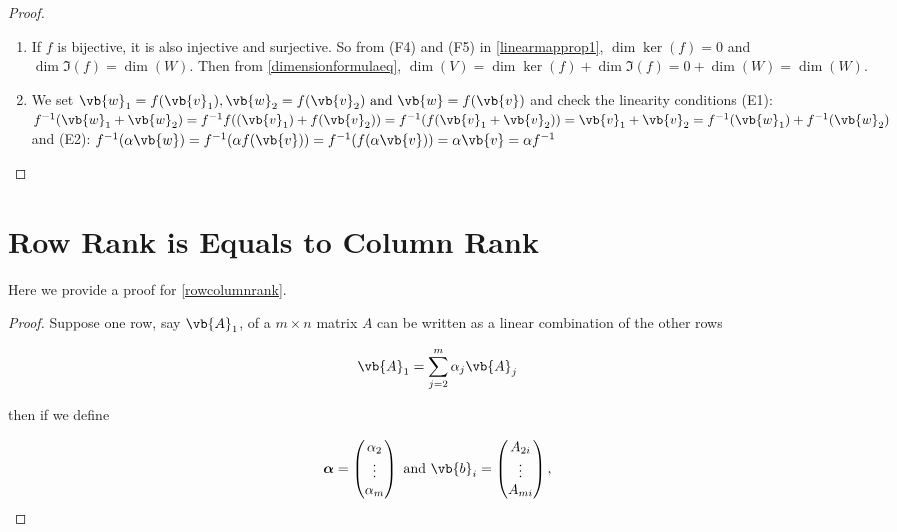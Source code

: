 \documentclass[a4paper,12pt]{report}
\begin{document}
\begin{appendices}
\begin{proof}
    \begin{enumerate}[label=(G\arabic*)]
        \item If \(f\)  is bijective, it is also injective and surjective. So from (F4) and (F5) in \cref{linearmapprop1}, \(\dim \ker (f) = 0\) and \(\dim \Im (f) = \dim (W)\). Then from \cref{dimensionformulaeq}, \(\dim (V) = \dim \ker (f) + \dim \Im (f) = 0 + \dim (W) = \dim (W)\).
        \item We set \(\vb{w} _{1} = f(\vb{v} _{1} ), \vb{w} _{2}  = f(\vb{v} _{2} ) \text { and } \vb{w} = f(\vb{v} )\) and check the linearity conditions (E1): \(f^{-1} (\vb{w} _{1} +\vb{w} _{2} ) = f^{-1} f((\vb{v} _{1}) + f(\vb{v} _{2} )) = f^{-1} (f(\vb{v} _{1} + \vb{v} _{2} )) = \vb{v} _{1} + \vb{v} _{2}  = f^{-1} (\vb{w} _{1}  ) + f^{-1} (\vb{w} _{2} )\) and (E2): \(f^{-1} (\alpha \vb{w} ) = f^{-1} (\alpha f(\vb{v} )) = f^{-1} (f(\alpha \vb{v} )) = \alpha \vb{v} = \alpha f^{-1}\)
    \end{enumerate}
\end{proof}
    
\section{Row Rank is Equals to Column Rank} \label{rowcolumnrankapp}

Here we provide a proof for \cref{rowcolumnrank}.

\begin{proof}
    Suppose one row, say \(\vb{A} _{1} \), of a \(m\times n\) matrix \(A\) can be written as a linear combination of the other rows

    \begin{equation}
        \vb{A} _{1} = \sum_{j=2}^{m} \alpha _{j} \vb{A} _{j} 
    \end{equation}

    then if we define 

    \begin{equation}
        \boldsymbol{\alpha } = \begin{pmatrix}
             \alpha _{2}  \\
             \vdots  \\
             \alpha _{m}  \\
        \end{pmatrix} \text { and } \vb{b} _{i} = \begin{pmatrix}
             A_{2i}   \\
             \vdots   \\
             A_{m i}  \\
        \end{pmatrix} ,
    \end{equation}
        

\end{proof}
\end{appendices}
\end{document}
